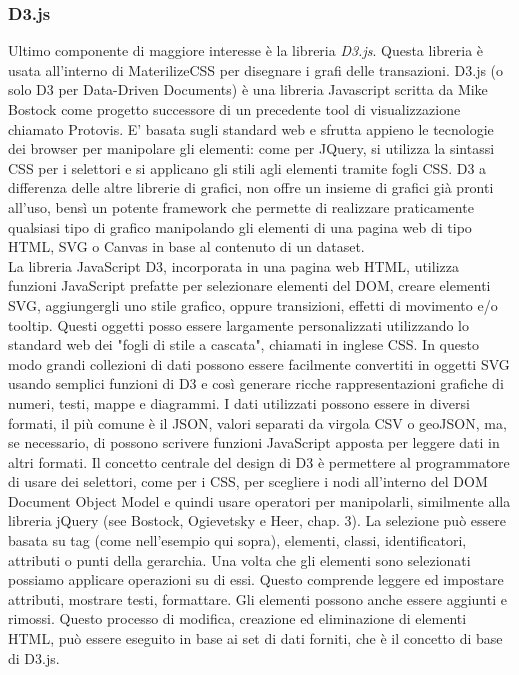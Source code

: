 \subsubsection{D3.js}
\label{sec:d3js}
Ultimo componente di maggiore interesse è la libreria \textit{D3.js}. Questa libreria è usata all'interno di MaterilizeCSS per disegnare i grafi delle transazioni. D3.js (o solo D3 per Data-Driven Documents) è una libreria Javascript scritta da Mike Bostock come progetto successore di un precedente tool di visualizzazione chiamato Protovis. E’ basata sugli standard web e sfrutta appieno le tecnologie dei browser per manipolare gli elementi: come per JQuery, si utilizza la sintassi CSS per i selettori e si applicano gli stili agli elementi tramite fogli CSS. D3 a differenza delle altre librerie di grafici, non offre un insieme di grafici già pronti all'uso, bensì un potente framework che permette di realizzare praticamente qualsiasi tipo di grafico manipolando gli elementi di una pagina web di tipo HTML, SVG o Canvas in base al contenuto di un dataset.
\\La libreria JavaScript D3, incorporata in una pagina web HTML, utilizza funzioni JavaScript prefatte per selezionare elementi del DOM, creare elementi SVG, aggiungergli uno stile grafico, oppure transizioni, effetti di movimento e/o tooltip. Questi oggetti posso essere largamente personalizzati utilizzando lo standard web dei "fogli di stile a cascata", chiamati in inglese CSS. In questo modo grandi collezioni di dati possono essere facilmente convertiti in oggetti SVG usando semplici funzioni di D3 e così generare ricche rappresentazioni grafiche di numeri, testi, mappe e diagrammi. I dati utilizzati possono essere in diversi formati, il più comune è il JSON, valori separati da virgola CSV o geoJSON, ma, se necessario, di possono scrivere funzioni JavaScript apposta per leggere dati in altri formati. Il concetto centrale del design di D3 è permettere al programmatore di usare dei selettori, come per i CSS, per scegliere i nodi all'interno del DOM Document Object Model e quindi usare operatori per manipolarli, similmente alla libreria jQuery (see Bostock, Ogievetsky e Heer, chap. 3). La selezione può essere basata su tag (come nell'esempio qui sopra), elementi, classi, identificatori, attributi o punti della gerarchia. Una volta che gli elementi sono selezionati possiamo applicare operazioni su di essi. Questo comprende leggere ed impostare attributi, mostrare testi, formattare. Gli elementi possono anche essere aggiunti e rimossi. Questo processo di modifica, creazione ed eliminazione di elementi HTML, può essere eseguito in base ai set di dati forniti, che è il concetto di base di D3.js.